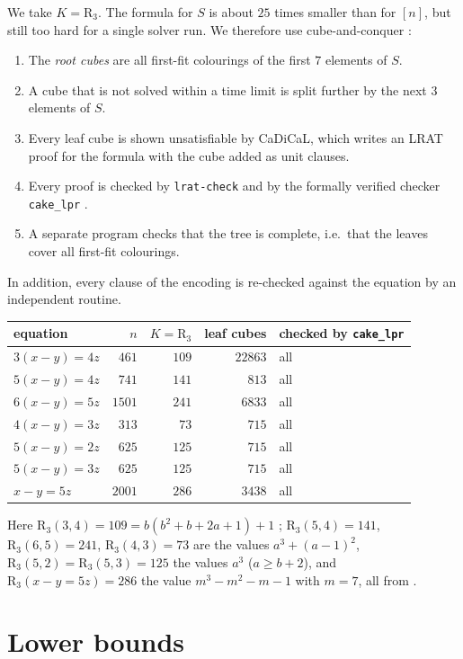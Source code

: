 \documentclass[11pt,a4paper]{article}
\theoremstyle{definition}
\theoremstyle{remark}
\newcommand{\R}{\mathrm{R}}
\begin{document}
We take $K=\R_3$. The formula for $S$ is about $25$ times smaller than for $[n]$, but still too hard for a single solver run. We therefore use cube-and-conquer \cite{HKM16}:
\begin{enumerate}
\item The \emph{root cubes} are all first-fit colourings of the first $7$ elements of $S$.
\item A cube that is not solved within a time limit is split further by the next $3$ elements of $S$.
\item Every leaf cube is shown unsatisfiable by CaDiCaL, which writes an LRAT proof for the formula with the cube added as unit clauses.
\item Every proof is checked by \texttt{lrat-check} and by the formally verified checker \texttt{cake\_lpr} \cite{THM21}.
\item A separate program checks that the tree is complete, i.e.\ that the leaves cover all first-fit colourings.
\end{enumerate}
In addition, every clause of the encoding is re-checked against the equation by an independent routine.

\begin{center}
\renewcommand{\arraystretch}{1.15}
\begin{tabular}{lrrrl}
\toprule
equation & $n$ & $K=\R_3$ & leaf cubes & checked by \texttt{cake\_lpr}\\
\midrule
$3(x-y)=4z$ & $461$ & $109$ & $22863$ & all\\
$5(x-y)=4z$ & $741$ & $141$ & $813$ & all\\
$6(x-y)=5z$ & $1501$ & $241$ & $6833$ & all\\
\midrule
$4(x-y)=3z$ & $313$ & $73$ & $715$ & all\\
$5(x-y)=2z$ & $625$ & $125$ & $715$ & all\\
$5(x-y)=3z$ & $625$ & $125$ & $715$ & all\\
$x-y=5z$ & $2001$ & $286$ & $3438$ & all\\
\bottomrule
\end{tabular}
\end{center}
Here $\R_3(3,4)=109=b(b^2+b+2a+1)+1$ \cite{AZB25,Ich26b}; $\R_3(5,4)=141$, $\R_3(6,5)=241$, $\R_3(4,3)=73$ are the values $a^3+(a-1)^2$, $\R_3(5,2)=\R_3(5,3)=125$ the values $a^3$ ($a\ge b+2$), and $\R_3(x-y=5z)=286$ the value $m^3-m^2-m-1$ with $m=7$, all from \cite{CDW22}.

\clearpage
\section{Lower bounds}\label{sec:lower}
\end{document}
